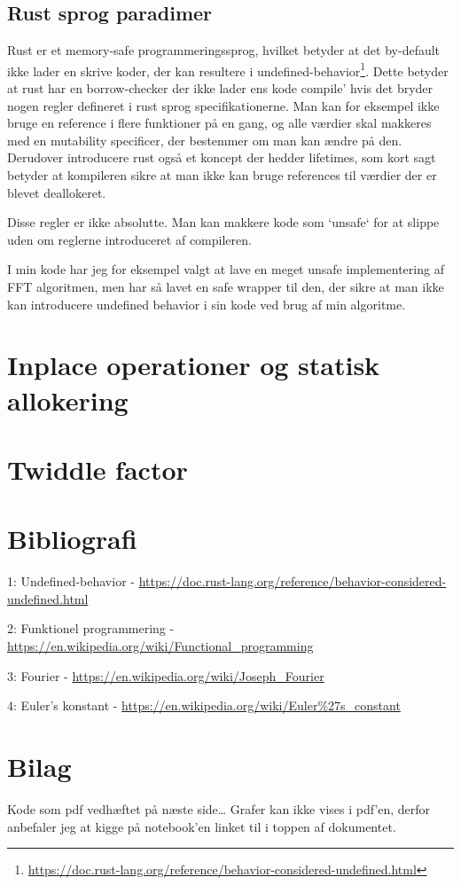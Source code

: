 \documentclass[11pt,a4paper]{article}
\begin{document}
\subsection{Rust sprog paradimer}
\label{sec:orgd2b9f06}
Rust er et memory-safe programmeringssprog,
hvilket betyder at det by-default ikke lader en skrive koder, der kan resultere i undefined-behavior\footnote{\url{https://doc.rust-lang.org/reference/behavior-considered-undefined.html}}.
Dette betyder at rust har en borrow-checker der ikke lader ens kode compile' hvis det bryder nogen regler defineret i rust sprog specifikationerne.
Man kan for eksempel ikke bruge en reference i flere funktioner på en gang, og alle værdier skal makkeres med
en mutability specificer, der bestemmer om man kan ændre på den. Derudover introducere rust også et koncept der hedder lifetimes,
som kort sagt betyder at kompileren sikre at man ikke kan bruge references til værdier der er blevet deallokeret.

\bigskip

Disse regler er ikke absolutte. Man kan makkere kode som `unsafe` for at slippe uden om reglerne introduceret af compileren.

I min kode har jeg for eksempel valgt at lave en meget unsafe implementering af FFT algoritmen,
men har så lavet en safe wrapper til den, der sikre at man ikke kan introducere undefined behavior i sin kode ved brug af min algoritme.

\section{Inplace operationer og statisk allokering}
\label{sec:orge18b239}

\section{Twiddle factor}
\label{sec:org7a84a8a}

\section{Bibliografi}
\label{sec:org3d6a7e0}

1: Undefined-behavior - \url{https://doc.rust-lang.org/reference/behavior-considered-undefined.html}

2: Funktionel programmering - \url{https://en.wikipedia.org/wiki/Functional\_programming}

3: Fourier - \url{https://en.wikipedia.org/wiki/Joseph\_Fourier}

4: Euler's konstant - \url{https://en.wikipedia.org/wiki/Euler\%27s\_constant}


\section{Bilag}
\label{sec:org0adfd87}

Kode som pdf vedhæftet på næste side\ldots{}
Grafer kan ikke vises i pdf'en, derfor anbefaler jeg at kigge på notebook'en linket til i toppen af dokumentet.


\end{document}
